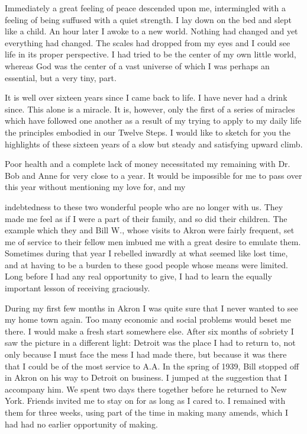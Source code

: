 \begin{biblechapter}
Immediately a great feeling of peace descended upon me, intermingled with a feeling of being suffused with a quiet strength. I lay down on the bed and slept like a child. An hour later I awoke to a new world. Nothing had changed and yet everything had changed. The scales had dropped from my eyes and I could see life in its proper perspective. I had tried to be the center of my own little world, whereas God was the center of a vast universe of which I was perhaps an essential, but a very tiny, part.

It is well over sixteen years since I came back to life. I have never had a drink since. This alone is a miracle. It is, however, only the first of a series of miracles which have followed one another as a result of my trying to apply to my daily life the principles embodied in our Twelve Steps. I would like to sketch for you the highlights of these sixteen years of a slow but steady and satisfying upward climb.

Poor health and a complete lack of money necessitated my remaining with Dr. Bob and Anne for very close to a year. It would be impossible for me to pass over this year without mentioning my love for, and my

indebtedness to these two wonderful people who are no longer with us. They made me feel as if I were a part of their family, and so did their children. The example which they and Bill W., whose visits to Akron were fairly frequent, set me of service to their fellow men imbued me with a great desire to emulate them. Sometimes during that year I rebelled inwardly at what seemed like lost time, and at having to be a burden to these good people whose means were limited. Long before I had any real opportunity to give, I had to learn the equally important lesson of receiving graciously.

During my first few months in Akron I was quite sure that I never wanted to see my home town again. Too many economic and social problems would beset me there. I would make a fresh start somewhere else. After six months of sobriety I saw the picture in a different light: Detroit was the place I had to return to, not only because I must face the mess I had made there, but because it was there that I could be of the most service to A.A. In the spring of 1939, Bill stopped off in Akron on his way to Detroit on business. I jumped at the suggestion that I accompany him. We spent two days there together before he returned to New York. Friends invited me to stay on for as long as I cared to. I remained with them for three weeks, using part of the time in making many amends, which I had had no earlier opportunity of making.


\end{biblechapter}
